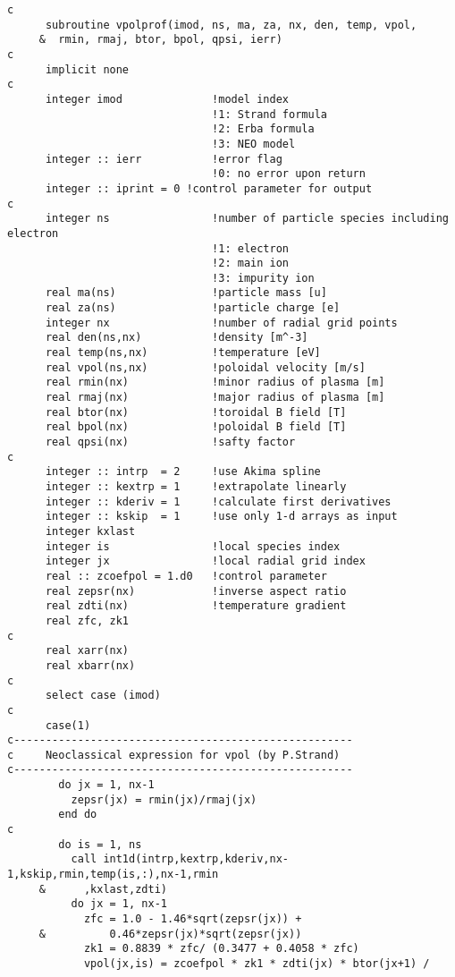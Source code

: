 \begin{verbatim}
c
      subroutine vpolprof(imod, ns, ma, za, nx, den, temp, vpol, 
     &  rmin, rmaj, btor, bpol, qpsi, ierr)
c
      implicit none
c
      integer imod              !model index
                                !1: Strand formula
                                !2: Erba formula
                                !3: NEO model
      integer :: ierr       	!error flag
                                !0: no error upon return
      integer :: iprint = 0	!control parameter for output
c      
      integer ns                !number of particle species including electron
                                !1: electron 
                                !2: main ion 
                                !3: impurity ion
      real ma(ns)               !particle mass [u]
      real za(ns)               !particle charge [e]
      integer nx                !number of radial grid points
      real den(ns,nx)           !density [m^-3]
      real temp(ns,nx)          !temperature [eV]
      real vpol(ns,nx)          !poloidal velocity [m/s]
      real rmin(nx)             !minor radius of plasma [m]
      real rmaj(nx)             !major radius of plasma [m]
      real btor(nx)             !toroidal B field [T]
      real bpol(nx)             !poloidal B field [T]
      real qpsi(nx)             !safty factor 
c
      integer :: intrp  = 2     !use Akima spline
      integer :: kextrp = 1     !extrapolate linearly
      integer :: kderiv = 1     !calculate first derivatives
      integer :: kskip  = 1     !use only 1-d arrays as input
      integer kxlast
      integer is                !local species index
      integer jx                !local radial grid index
      real :: zcoefpol = 1.d0   !control parameter 
      real zepsr(nx)            !inverse aspect ratio
      real zdti(nx)             !temperature gradient
      real zfc, zk1
c
      real xarr(nx)
      real xbarr(nx)
c
      select case (imod)
c      
      case(1)
c-----------------------------------------------------
c     Neoclassical expression for vpol (by P.Strand)        
c-----------------------------------------------------
        do jx = 1, nx-1
          zepsr(jx) = rmin(jx)/rmaj(jx)
        end do
c
        do is = 1, ns
          call int1d(intrp,kextrp,kderiv,nx-1,kskip,rmin,temp(is,:),nx-1,rmin
     &      ,kxlast,zdti)
          do jx = 1, nx-1
            zfc = 1.0 - 1.46*sqrt(zepsr(jx)) + 
     &			0.46*zepsr(jx)*sqrt(zepsr(jx))
            zk1 = 0.8839 * zfc/ (0.3477 + 0.4058 * zfc)
            vpol(jx,is) = zcoefpol * zk1 * zdti(jx) * btor(jx+1) /

\end{verbatim}
